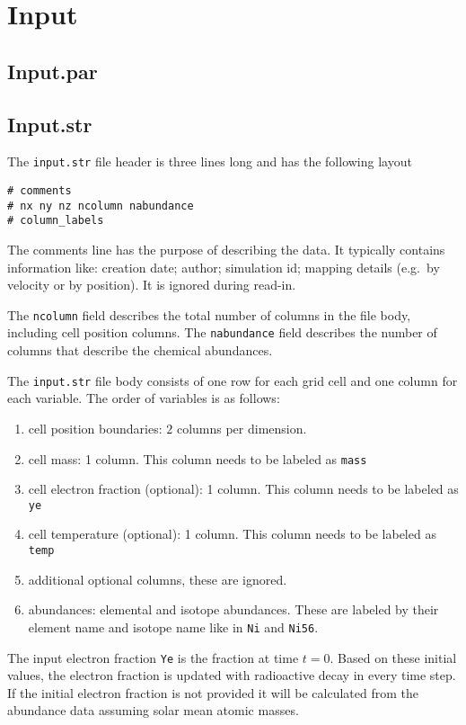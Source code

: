\documentclass{article}
\begin{document}
\section{Input}
\subsection{Input.par}


\subsection{Input.str}
The \texttt{input.str} file header is three lines long and has the following layout
\begin{verbatim}
# comments
# nx ny nz ncolumn nabundance
# column_labels
\end{verbatim}
The comments line has the purpose of describing the data.
It typically contains information like: creation date; author; simulation id; mapping details (e.g.\ by velocity or by position). It is ignored during read-in.

The \texttt{ncolumn} field describes the total number of columns in the file body, including cell position columns.
The \texttt{nabundance} field describes the number of columns that describe the chemical abundances.

The \texttt{input.str} file body consists of one row for each grid cell and one column for each variable.
The order of variables is as follows:
\begin{enumerate}
\item cell position boundaries: $2$ columns per dimension.
\item cell mass: 1 column.  This column needs to be labeled as \texttt{mass}
\item cell electron fraction (optional): 1 column.  This column needs to be labeled as \texttt{ye}
\item cell temperature (optional): 1 column.  This column needs to be labeled as \texttt{temp}
\item additional optional columns, these are ignored.
\item abundances: elemental and isotope abundances.  These are labeled by their element name and isotope name like in \texttt{Ni} and \texttt{Ni56}.
\end{enumerate}

The input electron fraction \texttt{Ye} is the fraction at time $t=0$.
Based on these initial values, the electron fraction is updated with radioactive decay in every time step.
If the initial electron fraction is not provided it will be calculated from the abundance data assuming solar mean atomic masses.
\end{document}
